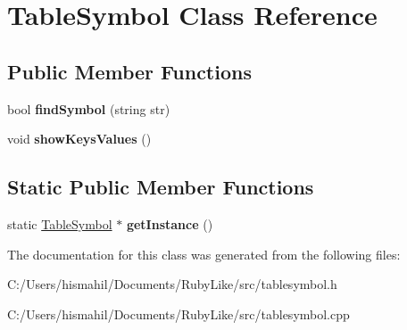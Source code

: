 \hypertarget{class_table_symbol}{\section{Table\-Symbol Class Reference}
\label{class_table_symbol}
}
\subsection*{Public Member Functions}
\begin{DoxyCompactItemize}
\item 
\hypertarget{class_table_symbol_ade8b6278058048d48c1f94615b367269}{bool {\bfseries find\-Symbol} (string str)}\label{class_table_symbol_ade8b6278058048d48c1f94615b367269}

\item 
\hypertarget{class_table_symbol_affae95bc57362eb5a9b43a0f4b2ff1d3}{void {\bfseries show\-Keys\-Values} ()}\label{class_table_symbol_affae95bc57362eb5a9b43a0f4b2ff1d3}

\end{DoxyCompactItemize}
\subsection*{Static Public Member Functions}
\begin{DoxyCompactItemize}
\item 
\hypertarget{class_table_symbol_a1d511bbd611e740b719e614e9a30d491}{static \hyperlink{class_table_symbol}{Table\-Symbol} $\ast$ {\bfseries get\-Instance} ()}\label{class_table_symbol_a1d511bbd611e740b719e614e9a30d491}

\end{DoxyCompactItemize}


The documentation for this class was generated from the following files\-:\begin{DoxyCompactItemize}
\item 
C\-:/\-Users/hismahil/\-Documents/\-Ruby\-Like/src/tablesymbol.\-h\item 
C\-:/\-Users/hismahil/\-Documents/\-Ruby\-Like/src/tablesymbol.\-cpp\end{DoxyCompactItemize}
